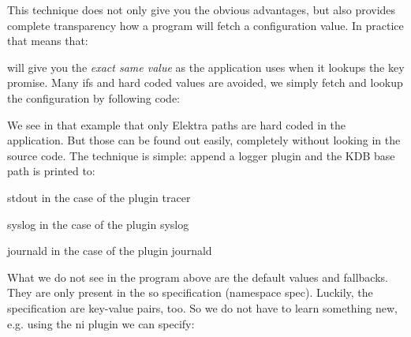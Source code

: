 This technique does not only give you the obvious advantages, but also provides complete transparency how a program will fetch a configuration value. In practice that means that\+:


\begin{DoxyCode}{0}
\end{DoxyCode}


will give you the {\itshape exact same value} as the application uses when it lookups the key {\ttfamily promise}. Many {\ttfamily if}s and hard coded values are avoided, we simply fetch and lookup the configuration by following code\+:


\begin{DoxyCode}{0}
\DoxyCodeLine{}
\end{DoxyCode}


We see in that example that only Elektra paths are hard coded in the application. But those can be found out easily, completely without looking in the source code. The technique is simple\+: append a logger plugin and the K\+DB base path is printed to\+:


\begin{DoxyItemize}
\item stdout in the case of the plugin tracer
\item syslog in the case of the plugin syslog
\item journald in the case of the plugin journald
\end{DoxyItemize}

What we do not see in the program above are the default values and fallbacks. They are only present in the so specification (namespace {\ttfamily spec}). Luckily, the specification are key-\/value pairs, too. So we do not have to learn something new, e.\+g. using the ni plugin we can specify\+:


